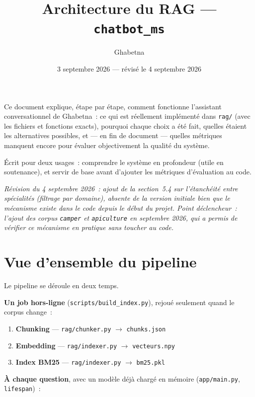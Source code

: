 \documentclass[11pt]{article}
\title{Architecture du RAG --- \texttt{chatbot\_ms}}
\author{Ghabetna}
\date{3 septembre 2026 --- révisé le 4 septembre 2026}
\begin{document}
\maketitle

Ce document explique, étape par étape, comment fonctionne l'assistant conversationnel de
Ghabetna~: ce qui est réellement implémenté dans \texttt{rag/} (avec les fichiers et fonctions
exacts), pourquoi chaque choix a été fait, quelles étaient les alternatives possibles, et --- en fin
de document --- quelles métriques manquent encore pour évaluer objectivement la qualité du
système.

Écrit pour deux usages~: comprendre le système en profondeur (utile en soutenance), et servir de
base avant d'ajouter les métriques d'évaluation au code.

\textit{Révision du 4 septembre 2026~: ajout de la section~5.4 sur l'étanchéité entre spécialités
(filtrage par domaine), absente de la version initiale bien que le mécanisme existe dans le code
depuis le début du projet. Point déclencheur~: l'ajout des corpus \texttt{camper} et
\texttt{apiculture} en septembre 2026, qui a permis de vérifier ce mécanisme en pratique sans
toucher au code.}

\tableofcontents

\section{Vue d'ensemble du pipeline}

Le pipeline se déroule en deux temps.

\textbf{Un job hors-ligne} (\texttt{scripts/build\_index.py}), rejoué seulement quand le corpus
change~:

\begin{enumerate}
  \item \textbf{Chunking} --- \texttt{rag/chunker.py} $\rightarrow$ \texttt{chunks.json}
  \item \textbf{Embedding} --- \texttt{rag/indexer.py} $\rightarrow$ \texttt{vecteurs.npy}
  \item \textbf{Index BM25} --- \texttt{rag/indexer.py} $\rightarrow$ \texttt{bm25.pkl}
\end{enumerate}

\textbf{À chaque question}, avec un modèle déjà chargé en mémoire (\texttt{app/main.py},
\texttt{lifespan})~:
\end{document}
